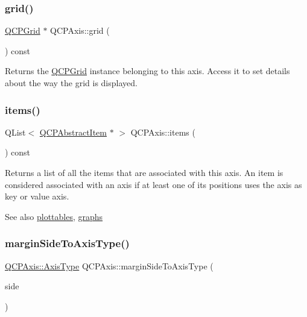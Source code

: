 \subsubsection{\texorpdfstring{grid()}{grid()}}
{\footnotesize\ttfamily \hyperlink{class_q_c_p_grid}{Q\+C\+P\+Grid} $\ast$ Q\+C\+P\+Axis\+::grid (\begin{DoxyParamCaption}{ }\end{DoxyParamCaption}) const\hspace{0.3cm}{\ttfamily [inline]}}

Returns the \hyperlink{class_q_c_p_grid}{Q\+C\+P\+Grid} instance belonging to this axis. Access it to set details about the way the grid is displayed. \mbox{\label{class_q_c_p_axis_a42761bc68e2f3a9f68549d45b73f705b}} 
\subsubsection{\texorpdfstring{items()}{items()}}
{\footnotesize\ttfamily Q\+List$<$ \hyperlink{class_q_c_p_abstract_item}{Q\+C\+P\+Abstract\+Item} $\ast$ $>$ Q\+C\+P\+Axis\+::items (\begin{DoxyParamCaption}{ }\end{DoxyParamCaption}) const}

Returns a list of all the items that are associated with this axis. An item is considered associated with an axis if at least one of its positions uses the axis as key or value axis.

\begin{DoxySeeAlso}{See also}
\hyperlink{class_q_c_p_axis_ac5e0f6f65c75efb5fd32275d6e4ef0d6}{plottables}, \hyperlink{class_q_c_p_axis_ad590c0da223697a2727f97a520870fec}{graphs} 
\end{DoxySeeAlso}
\mbox{\label{class_q_c_p_axis_ac0a6b77bd52bec6c81cd62d167cfeba6}} 
\subsubsection{\texorpdfstring{margin\+Side\+To\+Axis\+Type()}{marginSideToAxisType()}}
{\footnotesize\ttfamily \hyperlink{class_q_c_p_axis_ae2bcc1728b382f10f064612b368bc18a}{Q\+C\+P\+Axis\+::\+Axis\+Type} Q\+C\+P\+Axis\+::margin\+Side\+To\+Axis\+Type (\begin{DoxyParamCaption}\item[{\hyperlink{namespace_q_c_p_a7e487e3e2ccb62ab7771065bab7cae54}{Q\+C\+P\+::\+Margin\+Side}}]{side }\end{DoxyParamCaption})\hspace{0.3cm}{\ttfamily [static]}}

